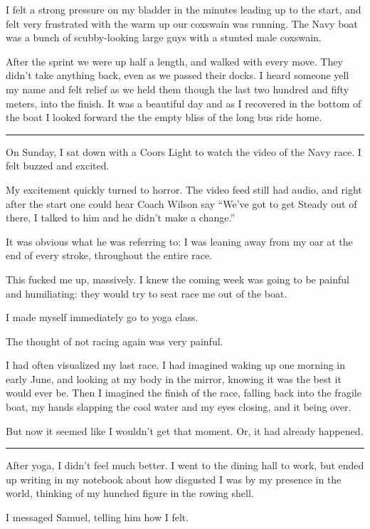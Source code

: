 I felt a strong pressure on my bladder in the minutes leading up to the start,
and felt very frustrated with the warm up our coxswain was running.  The Navy
boat was a bunch of scubby-looking large guys with a stunted male coxswain.

After the sprint we were up half a length, and walked with every move.  They
didn't take anything back, even as we passed their docks.  I heard someone yell
my name and felt relief as we held them though the last two hundred and fifty
meters, into the finish.  It was a beautiful day and as I recovered in the
bottom of the boat I looked forward the the empty bliss of the long bus ride
home.

\plainfancybreak{12pt}{2}{* * *}

On Sunday, I sat down with a Coors Light to watch the video of the Navy race.  I
felt buzzed and excited. 

My excitement quickly turned to horror.  The video feed still had audio, and
right after the start one could hear Coach Wilson say ``We've got to get Steady
out of there, I talked to him and he didn't make a change.''  

It was obvious what he was referring to: I was leaning away from my oar at the
end of every stroke, throughout the entire race.

This fucked me up, massively.  I knew the coming week was going to be painful and
humiliating: they would try to seat race me out of the boat.

I made myself immediately go to yoga class.  

The thought of not racing again was very painful.  

I had often visualized my last race.  I had imagined waking up one morning in
early June, and looking at my body in the mirror, knowing it was the best it
would ever be.  Then I imagined the finish of the race, falling back into the
fragile boat, my hands slapping the cool water and my eyes closing, and it being
over.

But now it seemed like I wouldn't get that moment.  Or, it had already happened.

\plainfancybreak{12pt}{2}{* * *}

After yoga, I didn't feel much better.  I went to the dining hall to work, but
ended up writing in my notebook about how disgusted I was by my presence in the
world, thinking of my hunched figure in the rowing shell.

I messaged Samuel, telling him how I felt.


